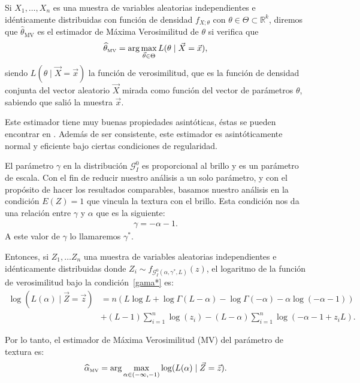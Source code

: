 \begin{definition}
Si $X_1, \ldots, X_n$ es una muestra de variables aleatorias independientes e idénticamente distribuidas con función de densidad $f_{X;\theta}$  con $\theta \in \Theta \subset \mathbb{R}^k$, diremos que $\widehat{\theta}_{\text{MV}}$ es el estimador de Máxima Verosimilitud de $\theta$ si verifica que 
\begin{align}
\widehat{\theta}_{{\text{\tiny{\text{MV}}}}}=\arg\max_{\vec{\theta} \in \Theta} L(\theta \mid \vec{X}=\vec{x}),
\end{align}
siendo $L(\theta \mid \vec{X}=\vec{x})$ la función de verosimilitud, que es la función de densidad conjunta del vector aleatorio $\vec{X}$ mirada como función del vector de parámetros $\theta$, sabiendo que salió la muestra $\vec{x}$.
\end{definition}
Este estimador tiene muy buenas propiedades asintóticas, éstas se pueden encontrar en  \citet{Casela2002}. 
Además de ser consistente, este estimador es asintóticamente normal y eficiente bajo ciertas condiciones de regularidad.

El parámetro $\gamma$ en la distribución $\mathcal{G}_I^0$  es proporcional al brillo y es un parámetro de escala. Con el fin de reducir nuestro análisis a un solo parámetro, y con el propósito de hacer los resultados comparables, basamos nuestro análisis en la condición $E(Z)=1$ que vincula la textura con el brillo. Esta condición nos da una relación entre $\gamma$ y $\alpha$ que es la siguiente:
\begin{align}
\label{gama*}
\gamma=-\alpha-1. 
\end{align}
A este valor de $\gamma$ lo llamaremos $\gamma^*$.

Entonces, si $Z_1,\ldots Z_n$ una muestra de variables aleatorias independientes e idénticamente distribuidas donde 
$Z_i \sim f_{\mathcal G_I^0(\alpha,\gamma^*,L)}(z)$,  el logaritmo de la función de verosimilitud bajo la condición~\eqref{gama*} es:
\begin{align}
\nonumber \log (L(\alpha) \mid \vec{Z}=\vec{z})&=n(L \log L+\log \Gamma(L-\alpha)-\log \Gamma(-\alpha) -\alpha \log(-\alpha-1))\\
& + (L-1) \sum_{i=1}^n \log(z_i)-(L-\alpha) \sum_{i=1}^n\log(-\alpha-1+z_i L).
\end{align}


Por lo tanto, el estimador de Máxima Verosimilitud (MV) del parámetro de textura es:
\begin{align}
\widehat{\alpha}_{{\text{\tiny{MV}}}}=\arg\max_{\alpha \in (-\infty,-1)} \log(L(\alpha)\mid \vec{Z}=\vec{z}).
\end{align}


